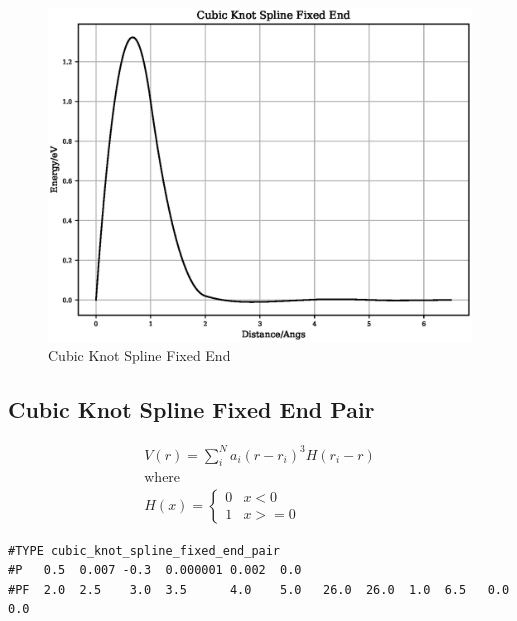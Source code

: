 \FloatBarrier
\begin{figure}[h]
  \begin{center}
    \includegraphics[scale=0.5]{appendix/functions/plots/cubic_knot_spline_fixed_end.eps}
    \caption{Cubic Knot Spline Fixed End}
    \label{graph:graph1}
  \end{center}
\end{figure}
\FloatBarrier







\subsection{Cubic Knot Spline Fixed End Pair}

\begin{equation}
\begin{split}
V(r) = \sum_i^N a_i (r - r_i)^3 H(r_i - r) \\
\text{where } \\
H(x) = \left\{ \begin{matrix} 0 & x<0 \\  1 & x >= 0 \end{matrix} \right . 
\end{split}
\label{eq:cubicKnotSplineFixedEndPair}
\end{equation}

\begin{lstlisting}[style=pseudocode,caption={Cubic Knot Spline Fixed End Pair}]
#TYPE cubic_knot_spline_fixed_end_pair
#P   0.5  0.007 -0.3  0.000001 0.002  0.0
#PF  2.0  2.5    3.0  3.5      4.0    5.0   26.0  26.0  1.0  6.5   0.0   0.0
\end{lstlisting}

